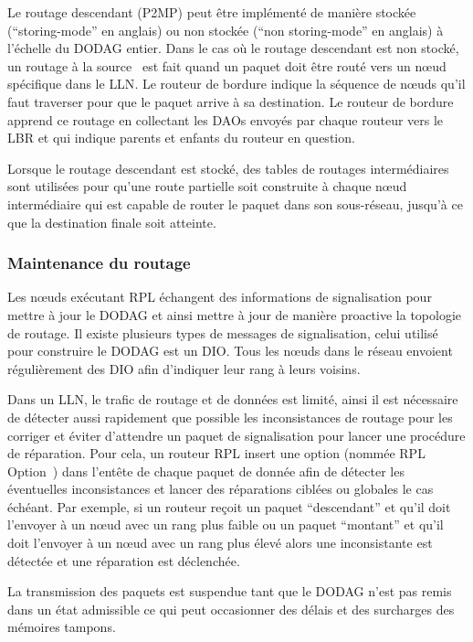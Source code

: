 Le routage descendant (\ac{P2MP}) peut être implémenté de manière stockée (``storing-mode'' en anglais) ou non stockée (``non storing-mode'' en anglais) à l'échelle du \ac{DODAG} entier.
Dans le cas où le routage descendant est non stocké, un routage à la source~\cite{rfc6554} est fait quand un paquet doit être routé vers un nœud spécifique dans le \ac{LLN}.
Le routeur de bordure indique la séquence de nœuds qu'il faut traverser pour que le paquet arrive à sa destination.
Le routeur de bordure apprend ce routage en collectant les \ac{DAO}s envoyés par chaque routeur vers le \ac{LBR} et qui indique parents et enfants du routeur en question.

Lorsque le routage descendant est stocké, des tables de routages intermédiaires sont utilisées pour qu'une route partielle soit construite à chaque nœud intermédiaire qui est capable de router le paquet dans son sous-réseau, jusqu'à ce que la destination finale soit atteinte.

\subsubsection{Maintenance du routage}

Les nœuds exécutant \ac{RPL} échangent des informations de signalisation pour mettre à jour le \ac{DODAG} et ainsi mettre à jour de manière proactive la topologie de routage.
Il existe plusieurs types de messages de signalisation, celui utilisé pour construire le \ac{DODAG} est un \ac{DIO}.
Tous les nœuds dans le réseau envoient régulièrement des \ac{DIO} afin d'indiquer leur rang à leurs voisins.

Dans un \ac{LLN}, le trafic de routage et de données est limité, ainsi il est nécessaire de détecter aussi rapidement que possible les inconsistances de routage pour les corriger et éviter d'attendre un paquet de signalisation pour lancer une procédure de réparation.
Pour cela, un routeur \ac{RPL} insert une option (nommée \ac{RPL} Option~\cite{rfc6553}) dans l'entête de chaque paquet de donnée afin de détecter les éventuelles inconsistances et lancer des réparations ciblées ou globales le cas échéant.  
Par exemple, si un routeur reçoit un paquet ``descendant'' et qu'il doit l'envoyer à un nœud avec un rang plus faible ou un paquet ``montant'' et qu'il doit l'envoyer à un nœud avec un rang plus élevé alors une inconsistante est détectée et une réparation est déclenchée.

La transmission des paquets est suspendue tant que le \ac{DODAG} n'est pas remis dans un état admissible ce qui peut occasionner des délais et des surcharges des mémoires tampons.

